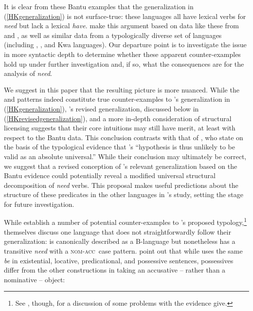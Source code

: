 \documentclass[output=paper,
modfonts
]{langscibook}
\begin{document}
It is clear from these Bantu examples  that the
generalization in (\ref{HKgeneralization}) is not surface-true: these
languages all have lexical verbs for {\it need} but lack a
lexical  {\it have}. \citet{Antonov:2014} make this argument  based on data like these from  and , as well as similar data from a typologically diverse set of
languages (including , , and Kwa languages). Our departure point is to
investigate the issue in more syntactic depth to determine whether
these apparent counter-examples hold up under further
investigation and, if so, what the consequences are for the \citet{Harves:2012}
analysis of {\it need}. 

We suggest in this paper that the resulting picture is more nuanced.  While the  and  patterns indeed constitute  true counter-examples to \citet{Harves:2012}'s generalization in
(\ref{HKgeneralization}), \citet{Harves:2012}'s revised generalization, discussed below in
(\ref{HKrevisedgeneralization}), and a more in-depth consideration of
structural licensing suggests that their core intuitions  may still have merit, at least with respect to the Bantu data. %
This conclusion  contrasts with that of \citet{Antonov:2014}, who state on the basis of the 
typological evidence  that \citet{Harves:2012}'s
``hypothesis is thus unlikely to be valid as an absolute universal.''
While their conclusion may ultimately be correct, we suggest that a revised
conception of \citet{Harves:2012}'s relevant generalization based on the Bantu evidence
could potentially reveal a modified universal structural decomposition of {\it need}
verbs. This proposal makes useful predictions about the
structure of these predicates in the other languages in \citet{Antonov:2014}'s study, setting the stage for future investigation.

 

While \citet{Antonov:2014} establish a number of potential counter-examples to \citet{Harves:2012}'s proposed typology,\footnote{See \citet{Kayne:2014b}, though, for a discussion of some problems with the evidence \citet{Antonov:2014} give.}  \citet{Harves:2012} themselves discuss one language that does not straightforwardly
follow their generalization:  is canonically described as a
B-language but nonetheless has a transitive {\it need}  with a
\textsc{nom}-\textsc{acc}\ case pattern. \citet{Harves:2012} point out that while  uses the same
{\it be}  in existential, locative, predicational, and possessive
sentences, possessives differ from the other constructions in taking
an accusative -- rather than a nominative -- object:
\end{document}
